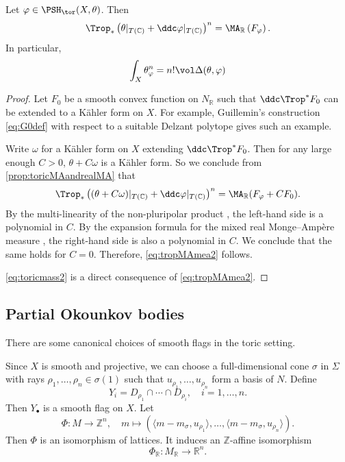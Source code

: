 \begin{proposition}\label{prop:toricMAandrealMA2}
    Let $\varphi\in \PSH_{\tor}(X,\theta)$. Then
    \begin{equation}\label{eq:tropMAmea2}
    \Trop_* \left(\theta|_{T(\mathbb{C})}+\ddc\varphi|_{T(\mathbb{C})} \right)^n=\MA_{\mathbb{R}}\left(F_{\varphi}\right).
    \end{equation}
    In particular,
    \begin{equation}\label{eq:toricmass2}
        \int_X \theta_{\varphi}^n =n! \vol \Delta(\theta,\varphi)
    \end{equation}
\end{proposition}
\begin{proof}
    Let $F_0$ be a smooth convex function on $N_{\mathbb{R}}$ such that $\ddc \Trop^* F_0$ can be extended to a K\"ahler form on $X$. For example, Guillemin's construction \eqref{eq:G0def} with respect to a suitable Delzant polytope gives such an example.


    Write $\omega$ for a Kähler form on $X$ extending $\ddc\Trop^*F_0$. Then for any large enough $C>0$, $\theta+C\omega$ is a Kähler form. So we conclude from \cref{prop:toricMAandrealMA} that
    \[
    \Trop_* \left((\theta+C\omega)|_{T(\mathbb{C})}+\ddc\varphi|_{T(\mathbb{C})} \right)^n=\MA_{\mathbb{R}}(F_{\varphi}+CF_0).
    \]
    By the multi-linearity of the non-pluripolar product , the left-hand side is a polynomial in $C$. By the expansion formula for the mixed real Monge--Amp\`ere measure , the right-hand side is also a polynomial in $C$. We conclude that the same holds for $C=0$. Therefore, \eqref{eq:tropMAmea2} follows.

    \eqref{eq:toricmass2} is a direct consequence of \eqref{eq:tropMAmea2}.
\end{proof}


\subsection{Partial Okounkov bodies}\label{subsec:pobtorgeneral}


There are some canonical choices of smooth flags in the toric setting.

Since $X$ is smooth and projective, we can choose a full-dimensional cone $\sigma$ in $\Sigma$ with rays $\rho_1,\ldots,\rho_n\in \sigma(1)$ such that $u_{\rho_1},\ldots,u_{\rho_n}$ form a basis of $N$. Define
\[
Y_i=D_{\rho_1}\cap\cdots\cap D_{\rho_i},\quad i=1,\ldots,n.
\]
Then $Y_{\bullet}$ is a smooth flag on $X$. Let
\begin{equation}\label{eq:isoMZncanonical}
\Phi\colon M\rightarrow \mathbb{Z}^n,\quad m\mapsto \left(\langle m-m_{\sigma},u_{\rho_1} \rangle,\dots,\langle m-m_{\sigma},u_{\rho_n} \rangle \right).
\end{equation}
Then $\Phi$ is an isomorphism of lattices.
It induces an $\mathbb{Z}$-affine isomorphism
\[
\Phi_{\mathbb{R}}\colon M_{\mathbb{R}}\rightarrow \mathbb{R}^n.
\]


